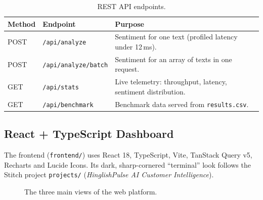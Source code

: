 \documentclass[11pt,a4paper]{article}
\begin{document}
\begin{table}[htbp]
\centering
\small
\begin{tabularx}{\textwidth}{@{}llX@{}}
\toprule
\textbf{Method} & \textbf{Endpoint} & \textbf{Purpose} \\
\midrule
POST & \texttt{/api/analyze}       & Sentiment for one text (profiled latency under 12\,ms). \\
POST & \texttt{/api/analyze/batch} & Sentiment for an array of texts in one request. \\
GET  & \texttt{/api/stats}         & Live telemetry: throughput, latency, sentiment distribution. \\
GET  & \texttt{/api/benchmark}     & Benchmark data served from \texttt{results.csv}. \\
\bottomrule
\end{tabularx}
\caption{REST API endpoints.}
\end{table}

\subsection{React + TypeScript Dashboard}
The frontend (\texttt{frontend/}) uses React 18, TypeScript, Vite, TanStack Query v5, Recharts and Lucide Icons. Its dark, sharp-cornered ``terminal'' look follows the Stitch project \texttt{projects/} (\textit{HinglishPulse AI Customer Intelligence}).

\begin{figure}[htbp]
\centering
{}
\caption{The three main views of the web platform.}
\label{fig:frontend_views}
\end{figure}
\end{document}
